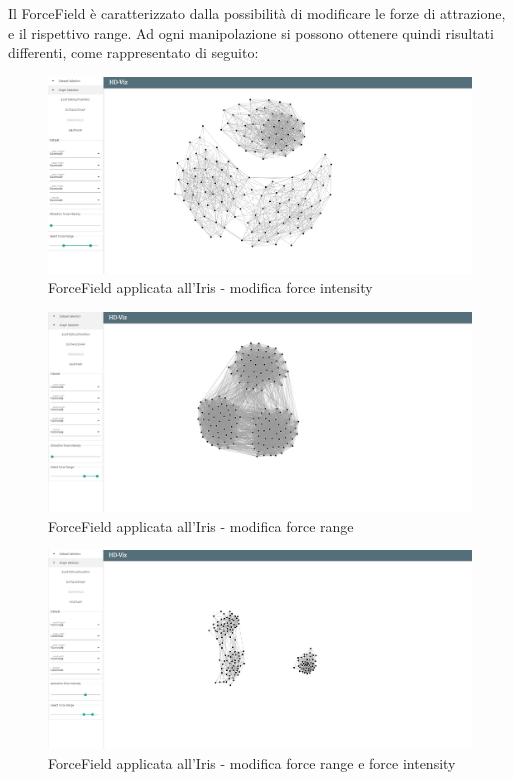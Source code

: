 \documentclass[../manuale_utente.tex]{subfiles}
\begin{document}
Il ForceField è caratterizzato dalla possibilità di modificare le forze di attrazione, e il rispettivo range. Ad ogni manipolazione si possono ottenere quindi risultati differenti, 
come rappresentato di seguito:

\begin{figure}[H]
	\centering
	\includegraphics[width=18cm]{src/img/ff/ff_iris_2}
	\caption{ForceField applicata all'Iris - modifica force intensity}
\end{figure}

\begin{figure}[H]
	\centering
	\includegraphics[width=18cm]{src/img/ff/ff_iris_3}
	\caption{ForceField applicata all'Iris - modifica force range}
\end{figure}

\begin{figure}[H]
	\centering
	\includegraphics[width=18cm]{src/img/ff/ff_iris_4}
	\caption{ForceField applicata all'Iris - modifica force range e force intensity}
\end{figure}
\end{document}
